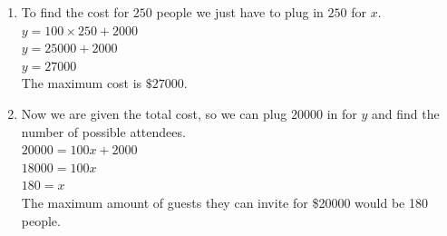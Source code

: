 \documentclass{ximera}
\begin{document}
\begin{example}
\begin{explanation}
\begin{enumerate}
\item To find the cost for $250$ people we just have to plug in $250$ for $x$.\\ 
$y = 100 \times 250 + 2000$\\
$y = 25000 + 2000$\\
$y = 27000$\\
The maximum cost is $\$27000$.
\item Now we are given the total cost, so we can plug $20000$ in for $y$ and find the number of possible attendees.\\
$20000 = 100x + 2000$\\
$18000 = 100x$\\
$180 = x$\\
The maximum amount of guests they can invite for \$20000 would be 180 people.
\end{enumerate}
\end{explanation}
\end{example}
\end{document}
